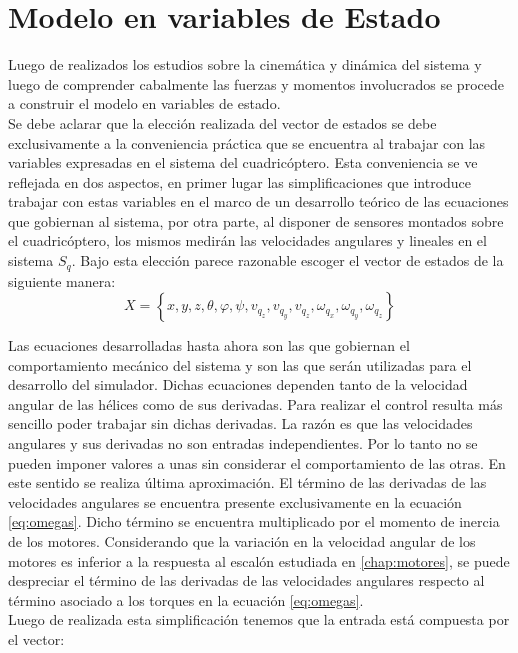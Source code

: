 \documentclass[main]{subfiles}
\begin{document}
\section{Modelo en variables de Estado}

Luego de realizados los estudios sobre la cinem\'atica y din\'amica del sistema y luego de comprender cabalmente las fuerzas y momentos involucrados se procede a construir el modelo en variables de estado.\\ 

Se debe aclarar que la elecci\'on realizada del vector de estados se debe exclusivamente a la conveniencia pr\'actica que se encuentra al trabajar con las variables expresadas en el sistema del cuadric\'optero. Esta conveniencia se ve reflejada en dos aspectos, en primer lugar las simplificaciones que introduce trabajar con estas variables en el marco de un desarrollo te\'orico de las ecuaciones que gobiernan al sistema, por otra parte, al disponer de sensores montados sobre el cuadric\'optero, los mismos medir\'an las velocidades angulares y lineales en el sistema $S_q$. Bajo esta elecci\'on parece razonable escoger el vector de estados de la siguiente manera:
$$X=\left\lbrace  x,y,z, \theta,\varphi,\psi, v_{q_z},v_{q_y},v_{q_z},\omega_{q_x},\omega_{q_y},\omega_{q_z} \right\rbrace$$

Las ecuaciones desarrolladas hasta ahora son las que gobiernan el comportamiento mecánico del sistema y son las que serán utilizadas para el desarrollo del simulador. Dichas ecuaciones dependen tanto de la velocidad angular de las hélices como de sus derivadas. Para realizar el control resulta m\'as sencillo poder trabajar sin dichas derivadas. La raz\'on es que las velocidades angulares y sus derivadas no son entradas independientes. Por lo tanto no se pueden imponer valores a unas sin considerar el comportamiento de las otras. En este sentido se realiza \'ultima aproximaci\'on. El t\'ermino de las derivadas de las velocidades angulares se encuentra presente exclusivamente en la ecuaci\'on \ref{eq:omegas}. Dicho t\'ermino se encuentra multiplicado por el momento de inercia de los motores. Considerando que la variaci\'on en la velocidad angular de los motores es inferior a la respuesta al escal\'on estudiada en \ref{chap:motores}, se puede despreciar el t\'ermino de las derivadas de las velocidades angulares respecto al t\'ermino asociado a los torques en la ecuaci\'on \ref{eq:omegas}.\\

Luego de realizada esta simplificaci\'on tenemos que la entrada est\'a compuesta por el vector:
\end{document}

